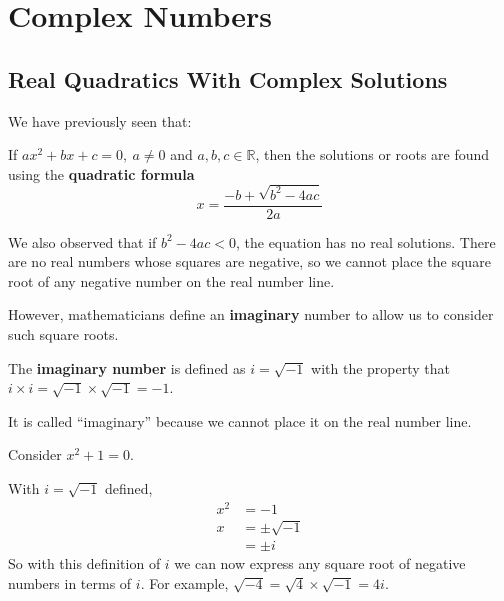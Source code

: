 \documentclass[11pt,a4paper]{book}
\newcommand{\R}{\mathbb{R}}
\begin{document}
\chapter{Complex Numbers}
\section{Real Quadratics With Complex Solutions}

We have previously seen that:

\medskip{}

\begin{tcolorbox}[colback=blue!5, colframe=black, boxrule=.4pt, sharpish corners]

If $ax^{2}+bx+c=0,\:a\neq0$ and $a,b,c\in\R$, then the solutions
or roots are found using the \textbf{quadratic formula}
\[
{\displaystyle x=\frac{-b+\sqrt{b^{2}-4ac}}{2a}}
\]
\end{tcolorbox}
We also observed that if $b^{2}-4ac<0$, the equation has no real
solutions. There are no real numbers whose squares are negative, so
we cannot place the square root of any negative number on the real
number line.

However, mathematicians define an \textbf{imaginary} number to allow
us to consider such square roots.

\medskip{}

\begin{tcolorbox}[colback=blue!5, colframe=black, boxrule=.4pt, sharpish corners]

The\textbf{ imaginary number} is defined as $i=\sqrt{-1}$
with the property that $i\times i=\sqrt{-1}\times\sqrt{-1}=-1$.
\end{tcolorbox}

It is called ``imaginary'' because we cannot place it on the real
number line.

Consider $x^{2}+1=0$.

With $i=\sqrt{-1}$ defined,
\begin{align*}
x^{2} & =-1\\
x & =\pm\sqrt{-1}\\
 & =\pm i
\end{align*}
So with this definition of $i$ we can now express any square root
of negative numbers in terms of $i$. For example, $\sqrt{-4}=\sqrt{4}\times\sqrt{-1}=4i$.

\newpage
\end{document}
